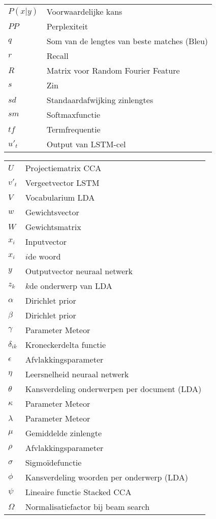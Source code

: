 \documentclass[master=cws,masteroption=ai]{kulemt}
\begin{document}
\begin{flushleft}
\begin{tabularx}{\textwidth}{@{}p{25mm}X@{}}
	$P(x|y) $& Voorwaardelijke kans\\
	$PP$ & Perplexiteit \\
	$q$ & Som van de lengtes van beste matches (Bleu)\\
	$r$& Recall \\
	$R$ & Matrix voor Random Fourier Feature \\
	$s$ & Zin \\
	$sd$ & Standaardafwijking zinlengtes\\
	$sm$ & Softmaxfunctie\\
	$tf$& Termfrequentie \\
	$u'_t$ & Output van LSTM-cel \\


	  \end{tabularx}
	\end{flushleft}
	
\begin{flushleft}
	\renewcommand{\arraystretch}{1.1}
	\begin{tabularx}{\textwidth}{@{}p{25mm}X@{}}
	$U$ &Projectiematrix CCA \\
	$v'_t$& Vergeetvector LSTM \\
	$V$ &Vocabularium LDA \\
	$w$ & Gewichtsvector\\
	$W$ & Gewichtsmatrix \\
	$x_i$ & Inputvector\\
	$x_i$ &$i$de woord\\
	$y$ & Outputvector neuraal netwerk\\
	$z_{k}$ & $k$de onderwerp van LDA \\
	$\alpha$ & Dirichlet prior\\
	$\beta$ & Dirichlet prior \\
	$\gamma$ & Parameter Meteor\\
	$\delta_{ik}$ & Kroneckerdelta functie\\
	$\epsilon$ & Afvlakkingsparameter\\
	$\eta$ & Leersnelheid neuraal netwerk\\
    $\theta$ & Kansverdeling onderwerpen per document (LDA)\\
	$\kappa$ & Parameter Meteor \\
	$\lambda$ & Parameter Meteor \\
	$\mu$ & Gemiddelde zinlengte\\
	$\rho$ & Afvlakkingsparameter\\
	$\sigma$ & Sigmo\"idefunctie \\
	$\phi$ & Kansverdeling woorden per onderwerp (LDA)\\
	$\psi$ & Lineaire functie Stacked CCA \\
	$\Omega$ & Normalisatiefactor bij beam search \\
		
	\end{tabularx}
\end{flushleft}
\end{document}
